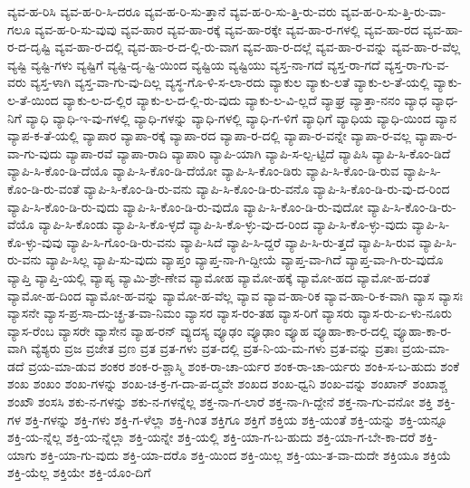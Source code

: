 {ವ್ಯವ-ಹ-ರಿಸಿ
ವ್ಯವ-ಹ-ರಿ-ಸಿ-ದರೂ
ವ್ಯವ-ಹ-ರಿ-ಸು-ತ್ತಾನೆ
ವ್ಯವ-ಹ-ರಿ-ಸು-ತ್ತಿ-ರು-ವರು
ವ್ಯವ-ಹ-ರಿ-ಸು-ತ್ತಿ-ರು-ವಾ-ಗಲೂ
ವ್ಯವ-ಹ-ರಿ-ಸು-ವುವು
ವ್ಯವ-ಹಾರ
ವ್ಯವ-ಹಾ-ರಕ್ಕೆ
ವ್ಯವ-ಹಾ-ರಕ್ಕೇ
ವ್ಯವ-ಹಾ-ರ-ಗಳಲ್ಲಿ
ವ್ಯವ-ಹಾ-ರದ
ವ್ಯವ-ಹಾ-ರ-ದ-ದೃಷ್ಟಿ
ವ್ಯವ-ಹಾ-ರ-ದಲ್ಲಿ
ವ್ಯವ-ಹಾ-ರ-ದ-ಲ್ಲಿ-ರು-ವಾಗ
ವ್ಯವ-ಹಾ-ರ-ದಲ್ಲೆ
ವ್ಯವ-ಹಾ-ರ-ವನ್ನು
ವ್ಯವ-ಹಾ-ರ-ವೆಲ್ಲ
ವ್ಯಷ್ಟಿ
ವ್ಯಷ್ಟಿ-ಗಳು
ವ್ಯಷ್ಟಿಗೆ
ವ್ಯಷ್ಟಿ-ದೃ-ಷ್ಟಿ-ಯಿಂದ
ವ್ಯಷ್ಟಿಯ
ವ್ಯಷ್ಟಿಯು
ವ್ಯಸ್ತ-ನಾ-ಗದೆ
ವ್ಯಸ್ತ-ರಾ-ಗದೆ
ವ್ಯಸ್ತ-ರಾ-ಗು-ವ-ವರು
ವ್ಯಸ್ತ-ಳಾಗಿ
ವ್ಯಸ್ತ-ವಾ-ಗು-ವು-ದಿಲ್ಲ
ವ್ಯಸ್ಥ-ಗೊ-ಳಿ-ಸ-ಲಾ-ರದು
ವ್ಯಾಕುಲ
ವ್ಯಾಕು-ಲತೆ
ವ್ಯಾಕು-ಲ-ತೆ-ಯಲ್ಲಿ
ವ್ಯಾಕು-ಲ-ತೆ-ಯಿಂದ
ವ್ಯಾಕು-ಲ-ದ-ಲ್ಲಿರ
ವ್ಯಾಕು-ಲ-ದ-ಲ್ಲಿ-ರು-ವುದು
ವ್ಯಾಕು-ಲ-ವಿ-ಲ್ಲದೆ
ವ್ಯಾಘ್ರ
ವ್ಯಾತ್ತಾ-ನನಂ
ವ್ಯಾಧ
ವ್ಯಾಧ-ನಿಗೆ
ವ್ಯಾಧಿ
ವ್ಯಾಧಿ-ಇ-ವು-ಗಳಲ್ಲಿ
ವ್ಯಾಧಿ-ಗಳನ್ನು
ವ್ಯಾಧಿ-ಗಳಲ್ಲಿ
ವ್ಯಾಧಿ-ಗ-ಳಿಗೆ
ವ್ಯಾಧಿಗೆ
ವ್ಯಾಧಿಯ
ವ್ಯಾಧಿ-ಯಿಂದ
ವ್ಯಾನ
ವ್ಯಾಪ-ಕ-ತೆ-ಯಲ್ಲಿ
ವ್ಯಾಪಾರ
ವ್ಯಾಪಾ-ರಕ್ಕೆ
ವ್ಯಾಪಾ-ರದ
ವ್ಯಾಪಾ-ರ-ದಲ್ಲಿ
ವ್ಯಾಪಾ-ರ-ವನ್ನೇ
ವ್ಯಾಪಾ-ರ-ವಲ್ಲ
ವ್ಯಾಪಾ-ರ-ವಾ-ಗು-ವುದು
ವ್ಯಾಪಾ-ರವೆ
ವ್ಯಾಪಾ-ರಾದಿ
ವ್ಯಾಪಾರಿ
ವ್ಯಾಪಿ-ಯಾಗಿ
ವ್ಯಾಪಿ-ಸ-ಲ್ಪ-ಟ್ಟಿದೆ
ವ್ಯಾಪಿಸಿ
ವ್ಯಾಪಿ-ಸಿ-ಕೊಂ-ಡಿದೆ
ವ್ಯಾಪಿ-ಸಿ-ಕೊಂ-ಡಿ-ದೆಯೊ
ವ್ಯಾಪಿ-ಸಿ-ಕೊಂ-ಡಿ-ದೆಯೋ
ವ್ಯಾಪಿ-ಸಿ-ಕೊಂ-ಡಿರು
ವ್ಯಾಪಿ-ಸಿ-ಕೊಂ-ಡಿ-ರುವ
ವ್ಯಾಪಿ-ಸಿ-ಕೊಂ-ಡಿ-ರು-ವಂತೆ
ವ್ಯಾಪಿ-ಸಿ-ಕೊಂ-ಡಿ-ರು-ವನು
ವ್ಯಾಪಿ-ಸಿ-ಕೊಂ-ಡಿ-ರು-ವನೊ
ವ್ಯಾಪಿ-ಸಿ-ಕೊಂ-ಡಿ-ರು-ವು-ದ-ರಿಂದ
ವ್ಯಾಪಿ-ಸಿ-ಕೊಂ-ಡಿ-ರು-ವುದು
ವ್ಯಾಪಿ-ಸಿ-ಕೊಂ-ಡಿ-ರು-ವುದೊ
ವ್ಯಾಪಿ-ಸಿ-ಕೊಂ-ಡಿ-ರು-ವುದೋ
ವ್ಯಾಪಿ-ಸಿ-ಕೊಂ-ಡಿ-ರು-ವೆಯೊ
ವ್ಯಾಪಿ-ಸಿ-ಕೊಂಡು
ವ್ಯಾಪಿ-ಸಿ-ಕೊ-ಳ್ಳದೆ
ವ್ಯಾಪಿ-ಸಿ-ಕೊ-ಳ್ಳು-ವು-ದ-ರಿಂದ
ವ್ಯಾಪಿ-ಸಿ-ಕೊ-ಳ್ಳು-ವುದು
ವ್ಯಾಪಿ-ಸಿ-ಕೊ-ಳ್ಳು-ವುವು
ವ್ಯಾಪಿ-ಸಿ-ಗೊಂ-ಡಿ-ರು-ವನು
ವ್ಯಾಪಿ-ಸಿದೆ
ವ್ಯಾಪಿ-ಸಿ-ದ್ದರೆ
ವ್ಯಾಪಿ-ಸಿ-ರು-ತ್ತದೆ
ವ್ಯಾಪಿ-ಸಿ-ರುವ
ವ್ಯಾಪಿ-ಸಿ-ರು-ವನು
ವ್ಯಾಪಿ-ಸಿಲ್ಲ
ವ್ಯಾಪಿ-ಸು-ವುದು
ವ್ಯಾಪ್ತಂ
ವ್ಯಾಪ್ತ-ನಾ-ಗಿ-ದ್ದೀಯೆ
ವ್ಯಾಪ್ತ-ವಾ-ಗಿದೆ
ವ್ಯಾಪ್ತ-ವಾ-ಗಿ-ರು-ವುದೊ
ವ್ಯಾಪ್ತಿ
ವ್ಯಾಪ್ತಿ-ಯಲ್ಲಿ
ವ್ಯಾಪ್ಯ
ವ್ಯಾಮಿ-ಶ್ರೇ-ಣೇವ
ವ್ಯಾಮೋಹ
ವ್ಯಾಮೋ-ಹಕ್ಕೆ
ವ್ಯಾಮೋ-ಹದ
ವ್ಯಾಮೋ-ಹ-ದಂತೆ
ವ್ಯಾಮೋ-ಹ-ದಿಂದ
ವ್ಯಾಮೋ-ಹ-ವನ್ನು
ವ್ಯಾಮೋ-ಹ-ವೆಲ್ಲ
ವ್ಯಾವ
ವ್ಯಾವ-ಹಾ-ರಿಕ
ವ್ಯಾವ-ಹಾ-ರಿ-ಕ-ವಾಗಿ
ವ್ಯಾಸ
ವ್ಯಾಸಃ
ವ್ಯಾಸನೇ
ವ್ಯಾಸ-ಪ್ರ-ಸಾ-ದು-ಚ್ಛ್ರ-ತ-ವಾ-ನಿಮಂ
ವ್ಯಾಸರ
ವ್ಯಾಸ-ರಂ-ತಹ
ವ್ಯಾಸ-ರಿಗೆ
ವ್ಯಾಸರು
ವ್ಯಾಸ-ರು-ಏ-ಳು-ನೂರು
ವ್ಯಾಸ-ರೆಂಬ
ವ್ಯಾಸರೇ
ವ್ಯಾಸೇನ
ವ್ಯಾಹ-ರನ್
ವ್ಯುದಸ್ಯ
ವ್ಯೂಢಂ
ವ್ಯೂಢಾಂ
ವ್ಯೂಹ
ವ್ಯೂಹಾ-ಕಾ-ರ-ದಲ್ಲಿ
ವ್ಯೂಹಾ-ಕಾ-ರ-ವಾಗಿ
ವ್ಯೆಶ್ಯರು
ವ್ರಜ
ವ್ರಜೇತ
ವ್ರಣ
ವ್ರತ
ವ್ರತ-ಗಳು
ವ್ರತ-ದಲ್ಲಿ
ವ್ರತ-ನಿ-ಯ-ಮ-ಗಳು
ವ್ರತ-ವನ್ನು
ವ್ರತಾಃ
ವ್ರಯ-ಮಾ-ಡದೆ
ವ್ರಯ-ಮಾ-ಡುವ
ಶಂಕರ
ಶಂಕ-ರ-ಶ್ಚಾಸ್ಮಿ
ಶಂಕ-ರಾ-ಚಾ-ರ್ಯರ
ಶಂಕ-ರಾ-ಚಾ-ರ್ಯರು
ಶಂಕಿ-ಸ-ಬ-ಹುದು
ಶಂಕೆ
ಶಂಖ
ಶಂಖಂ
ಶಂಖ-ಗಳನ್ನು
ಶಂಖ-ಚ-ಕ್ರ-ಗ-ದಾ-ಪ-ದ್ಮವೇ
ಶಂಖದ
ಶಂಖ-ಧ್ವನಿ
ಶಂಖ-ವನ್ನು
ಶಂಖಾನ್
ಶಂಖಾಶ್ಚ
ಶಂಖೌ
ಶಂಸಸಿ
ಶಕು-ನ-ಗಳನ್ನು
ಶಕು-ನ-ಗಳನ್ನೆಲ್ಲ
ಶಕ್ತ-ನಾ-ಗ-ಲಾರೆ
ಶಕ್ತ-ನಾ-ಗಿ-ದ್ದೇನೆ
ಶಕ್ತ-ನಾ-ಗು-ವನೋ
ಶಕ್ತಿ
ಶಕ್ತಿ-ಗಳ
ಶಕ್ತಿ-ಗಳನ್ನು
ಶಕ್ತಿ-ಗಳು
ಶಕ್ತಿ-ಗ-ಳೆಲ್ಲಾ
ಶಕ್ತಿ-ಗಿಂತ
ಶಕ್ತಿಗೂ
ಶಕ್ತಿಗೆ
ಶಕ್ತಿಯ
ಶಕ್ತಿ-ಯಂತೆ
ಶಕ್ತಿ-ಯನ್ನು
ಶಕ್ತಿ-ಯನ್ನೂ
ಶಕ್ತಿ-ಯ-ನ್ನೆಲ್ಲ
ಶಕ್ತಿ-ಯ-ನ್ನೆಲ್ಲಾ
ಶಕ್ತಿ-ಯನ್ನೇ
ಶಕ್ತಿ-ಯಲ್ಲಿ
ಶಕ್ತಿ-ಯಾ-ಗ-ಬ-ಹುದು
ಶಕ್ತಿ-ಯಾ-ಗ-ಬೇ-ಕಾ-ದರೆ
ಶಕ್ತಿ-ಯಾಗು
ಶಕ್ತಿ-ಯಾ-ಗು-ವುದು
ಶಕ್ತಿ-ಯಾ-ದರೊ
ಶಕ್ತಿ-ಯಿಂದ
ಶಕ್ತಿ-ಯಿಲ್ಲ
ಶಕ್ತಿ-ಯು-ತ-ವಾ-ದುದೇ
ಶಕ್ತಿಯೂ
ಶಕ್ತಿಯೆ
ಶಕ್ತಿ-ಯೆಲ್ಲ
ಶಕ್ತಿಯೇ
ಶಕ್ತಿ-ಯೊಂ-ದಿಗೆ
}
